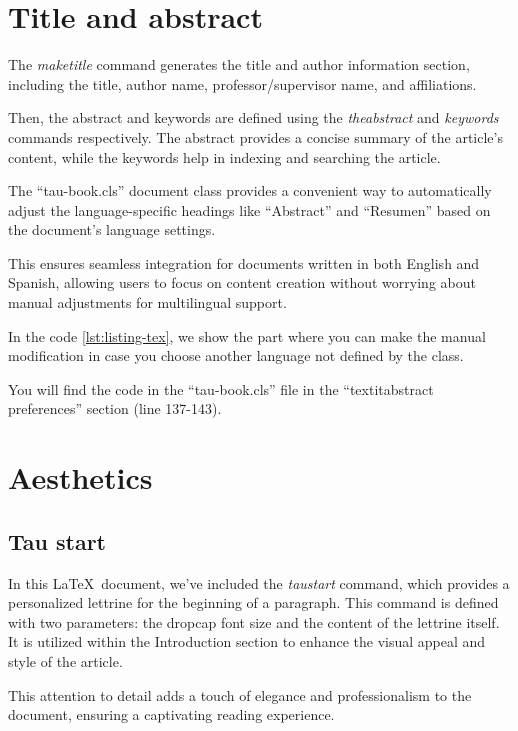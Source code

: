 \documentclass[10pt,a4paper,twoside]{main}
\begin{document}
\section{Title and abstract}

    The \textit{maketitle} command generates the title and author information section, including the title, author name, professor/supervisor name, and affiliations.

    Then, the abstract and keywords are defined using the \textit{theabstract} and \textit{keywords} commands respectively. The abstract provides a concise summary of the article's content, while the keywords help in indexing and searching the article.

    The ``tau-book.cls'' document class provides a convenient way to automatically adjust the language-specific headings like ``Abstract'' and ``Resumen'' based on the document's language settings.

    This ensures seamless integration for documents written in both English and Spanish, allowing users to focus on content creation without worrying about manual adjustments for multilingual support.

    In the code \ref{lst:listing-tex}, we show the part where you can make the manual modification in case you choose another language not defined by the class.

    

    You will find the code in the ``tau-book.cls'' file in the ``textit{abstract preferences}'' section (line 137-143).

\section{Aesthetics}

    \subsection{Tau start}

        In this \LaTeX\ document, we've included the \textit{taustart} command, which provides a personalized lettrine for the beginning of a paragraph. This command is defined with two parameters: the dropcap font size and the content of the lettrine itself. It is utilized within the Introduction section to enhance the visual appeal and style of the article.

        This attention to detail adds a touch of elegance and professionalism to the document, ensuring a captivating reading experience.
\end{document}
